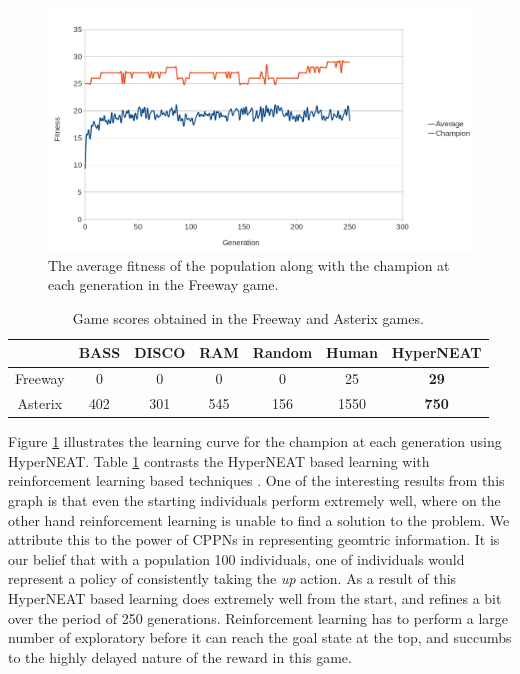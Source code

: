\documentclass{article}
\begin{document}
\begin{figure}[ht]
\begin{center}
\includegraphics[scale=.35]{figures/freeway.jpg}
\end{center}
\caption{The average fitness of the population along with the champion at each generation in the Freeway game.}
\label{fig:freeway-curve}
\end{figure}

\begin{table}
\begin{center}
\begin{tabular}{|c|c|c|c|c|c|c|}
\hline
~       & BASS & DISCO & RAM & Random & Human & HyperNEAT \\ \hline
Freeway & 0    & 0     & 0   & 0      & 25    & \textbf{29}        \\ \hline
Asterix & 402  & 301   & 545 & 156    & 1550  & \textbf{750}       \\ 
\hline
\end{tabular}
\end{center}
\label{tab:results-table}
\caption{Game scores obtained in the Freeway and Asterix games.}
\end{table}

Figure \ref{fig:freeway-curve} illustrates the learning curve for the champion at each generation using HyperNEAT. Table \ref{tab:results-table} contrasts the HyperNEAT based learning with reinforcement learning based techniques \cite{naddaf10}. One of the interesting results from this graph is that even the starting individuals perform extremely well, where on the other hand reinforcement learning is unable to find a solution to the problem. We attribute this to the power of CPPNs in representing geomtric information. It is our belief that with a population 100 individuals, one of individuals would represent a policy of consistently taking the \textit{up} action. As a result of this HyperNEAT based learning does extremely well from the start, and refines a bit over the period of 250 generations. Reinforcement learning has to perform a large number of exploratory before it can reach the goal state at the top, and succumbs to the highly delayed nature of the reward in this game.
\end{document}
